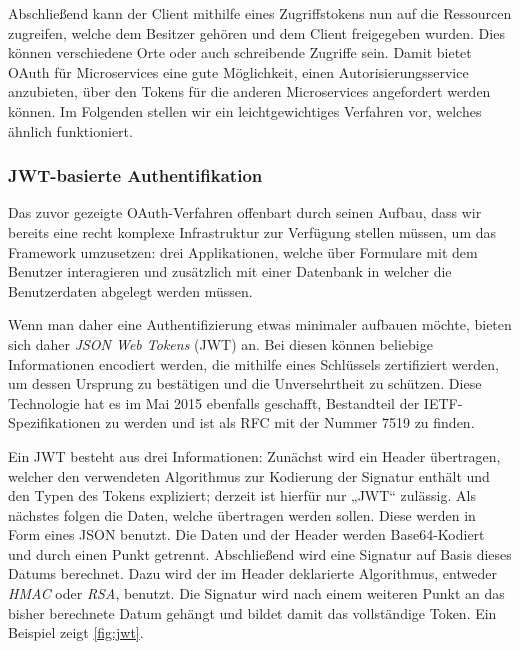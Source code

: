 Abschließend kann der Client mithilfe eines Zugriffstokens nun auf die Ressourcen zugreifen, welche dem Besitzer gehören und dem Client freigegeben wurden. Dies können verschiedene Orte oder auch schreibende Zugriffe sein. Damit bietet OAuth für Microservices eine gute Möglichkeit, einen Autorisierungsservice anzubieten, über den Tokens für die anderen Microservices angefordert werden können. Im Folgenden stellen wir ein leichtgewichtiges Verfahren vor, welches ähnlich funktioniert.


\subsubsection{JWT-basierte Authentifikation}

Das zuvor gezeigte OAuth-Verfahren offenbart durch seinen Aufbau, dass wir bereits eine recht komplexe Infrastruktur zur Verfügung stellen müssen, um das Framework umzusetzen: drei Applikationen, welche über Formulare mit dem Benutzer interagieren und zusätzlich mit einer Datenbank in welcher die Benutzerdaten abgelegt werden müssen.

Wenn man daher eine Authentifizierung etwas minimaler aufbauen möchte, bieten sich daher \textit{JSON Web Tokens} (JWT) an. Bei diesen können beliebige Informationen encodiert werden, die mithilfe eines Schlüssels zertifiziert werden, um dessen Ursprung zu bestätigen und die Unversehrtheit zu schützen. Diese Technologie hat es im Mai 2015 ebenfalls geschafft, Bestandteil der IETF-Spezifikationen zu werden und ist als RFC mit der Nummer 7519 zu finden. \cite{RFC7519}

Ein JWT besteht aus drei Informationen: Zunächst wird ein Header übertragen, welcher den verwendeten Algorithmus zur Kodierung der Signatur enthält und den Typen des Tokens expliziert; derzeit ist hierfür nur „JWT“ zulässig. Als nächstes folgen die Daten, welche übertragen werden sollen. Diese werden in Form eines JSON benutzt. Die Daten und der Header werden Base64-Kodiert und durch einen Punkt getrennt. Abschließend wird eine Signatur auf Basis dieses Datums berechnet. Dazu wird der im Header deklarierte Algorithmus, entweder \textit{HMAC} oder \textit{RSA}, benutzt. Die Signatur wird nach einem weiteren Punkt an das bisher berechnete Datum gehängt und bildet damit das vollständige Token. Ein Beispiel zeigt \autoref{fig:jwt}.

